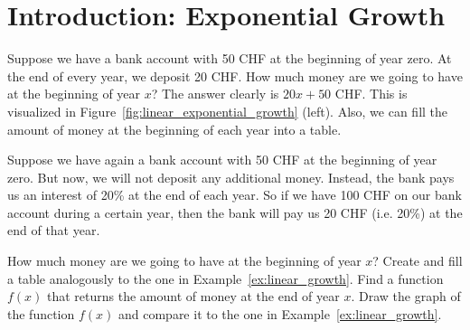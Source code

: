\section{Introduction: Exponential Growth}
\begin{example} \label{ex:linear_growth}
	Suppose we have a bank account with 50 CHF at the beginning of year zero.
	At the end of every year, we deposit 20 CHF.
	How much money are we going to have at the beginning of year $x$?
	The answer clearly is $20x+50$ CHF.
	This is visualized in Figure~\ref{fig:linear_exponential_growth} (left).
	Also, we can fill the amount of money at the beginning of each year into a table.
	\begin{center}
	\end{center}
\end{example}
\begin{exercise} \label{ex:exponential_growth}
	Suppose we have again a bank account with 50 CHF at the beginning of year zero.
	But now, we will not deposit any additional money.
	Instead, the bank pays us an interest of 20\% at the end of each year.
	So if we have 100 CHF on our bank account during a certain year, then the bank will pay us 20 CHF (i.e. 20\%) at the end of that year.
	\begin{tasks}
		\task How much money are we going to have at the beginning of year $x$? Create and fill a table analogously to the one in Example~\ref{ex:linear_growth}.
		\task Find a function $f\left(x\right)$ that returns the amount of money at the end of year $x$.
		\task Draw the graph of the function $f\left(x\right)$ and compare it to the one in Example~\ref{ex:linear_growth}.
	\end{tasks}
\end{exercise}
